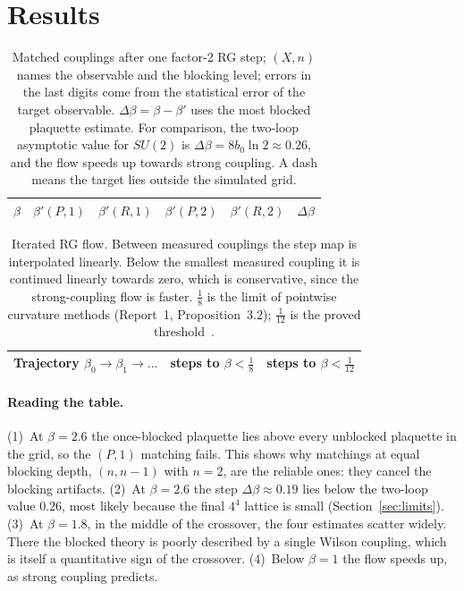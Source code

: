 \documentclass[11pt,a4paper]{article}
\begin{document}
\section{Results}

\begin{table}[h]
\centering\small
\begin{tabular}{@{}llllll@{}}
\toprule
$\beta$ & $\beta'(P,1)$ & $\beta'(R,1)$ & $\beta'(P,2)$ & $\beta'(R,2)$ & $\Delta\beta$\\
\midrule

\end{tabular}
\caption{Matched couplings after one factor-2 RG step; $(X,n)$ names the observable and the blocking level; errors in the last digits come from the statistical error of the target observable. $\Delta\beta=\beta-\beta'$ uses the most blocked plaquette estimate. For comparison, the two-loop asymptotic value for $SU(2)$ is $\Delta\beta=8b_0\ln2\approx0.26$, and the flow speeds up towards strong coupling. A dash means the target lies outside the simulated grid.}\label{tab:mcrg}
\end{table}

\begin{table}[h]
\centering\small
\begin{tabular}{@{}p{10.2cm}cc@{}}
\toprule
Trajectory $\beta_0\to\beta_1\to\dots$ & steps to $\beta<\tfrac18$ & steps to $\beta<\tfrac1{12}$\\
\midrule

\end{tabular}
\caption{Iterated RG flow. Between measured couplings the step map is interpolated linearly. Below the smallest measured coupling it is continued linearly towards zero, which is conservative, since the strong-coupling flow is faster. $\tfrac18$ is the limit of pointwise curvature methods (Report~1, Proposition~3.2); $\tfrac1{12}$ is the proved threshold~\cite{SZZ23}.}\label{tab:flow}
\end{table}

\paragraph{Reading the table.} (1)~At $\beta=2.6$ the once-blocked plaquette lies above every unblocked plaquette in the grid, so the $(P,1)$ matching fails. This shows why matchings at equal blocking depth, $(n,n-1)$ with $n=2$, are the reliable ones: they cancel the blocking artifacts. (2)~At $\beta=2.6$ the step $\Delta\beta\approx0.19$ lies below the two-loop value $0.26$, most likely because the final $4^4$ lattice is small (Section~\ref{sec:limits}). (3)~At $\beta=1.8$, in the middle of the crossover, the four estimates scatter widely. There the blocked theory is poorly described by a single Wilson coupling, which is itself a quantitative sign of the crossover. (4)~Below $\beta=1$ the flow speeds up, as strong coupling predicts.
\end{document}
